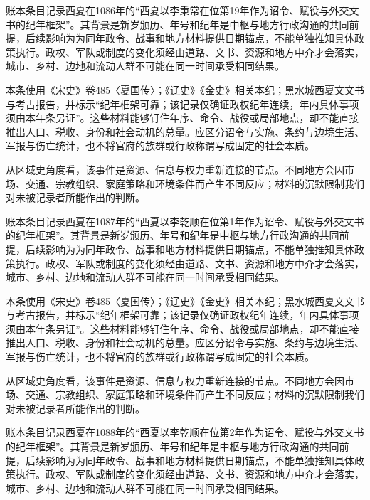 账本条目记录西夏在1086年的“西夏以李秉常在位第19年作为诏令、赋役与外交文书的纪年框架”。其背景是新岁颁历、年号和纪年是中枢与地方行政沟通的共同前提，后续影响为为同年政令、战事和地方材料提供日期锚点，不能单独推知具体政策执行。政权、军队或制度的变化须经由道路、文书、资源和地方中介才会落实，城市、乡村、边地和流动人群不可能在同一时间承受相同结果。

本条使用《宋史》卷485〈夏国传〉；《辽史》《金史》相关本纪；黑水城西夏文文书与考古报告，并标示“纪年框架可靠；该记录仅确证政权纪年连续，年内具体事项须由本年条另证”。这些材料能够钉住年序、命令、战役或局部地点，却不能直接推出人口、税收、身份和社会动机的总量。应区分诏令与实施、条约与边境生活、军报与伤亡统计，也不将官府的族群或行政称谓写成固定的社会本质。

从区域史角度看，该事件是资源、信息与权力重新连接的节点。不同地方会因市场、交通、宗教组织、家庭策略和环境条件而产生不同反应；材料的沉默限制我们对未被记录者所能作出的判断。

账本条目记录西夏在1087年的“西夏以李乾顺在位第1年作为诏令、赋役与外交文书的纪年框架”。其背景是新岁颁历、年号和纪年是中枢与地方行政沟通的共同前提，后续影响为为同年政令、战事和地方材料提供日期锚点，不能单独推知具体政策执行。政权、军队或制度的变化须经由道路、文书、资源和地方中介才会落实，城市、乡村、边地和流动人群不可能在同一时间承受相同结果。

本条使用《宋史》卷485〈夏国传〉；《辽史》《金史》相关本纪；黑水城西夏文文书与考古报告，并标示“纪年框架可靠；该记录仅确证政权纪年连续，年内具体事项须由本年条另证”。这些材料能够钉住年序、命令、战役或局部地点，却不能直接推出人口、税收、身份和社会动机的总量。应区分诏令与实施、条约与边境生活、军报与伤亡统计，也不将官府的族群或行政称谓写成固定的社会本质。

从区域史角度看，该事件是资源、信息与权力重新连接的节点。不同地方会因市场、交通、宗教组织、家庭策略和环境条件而产生不同反应；材料的沉默限制我们对未被记录者所能作出的判断。

账本条目记录西夏在1088年的“西夏以李乾顺在位第2年作为诏令、赋役与外交文书的纪年框架”。其背景是新岁颁历、年号和纪年是中枢与地方行政沟通的共同前提，后续影响为为同年政令、战事和地方材料提供日期锚点，不能单独推知具体政策执行。政权、军队或制度的变化须经由道路、文书、资源和地方中介才会落实，城市、乡村、边地和流动人群不可能在同一时间承受相同结果。

